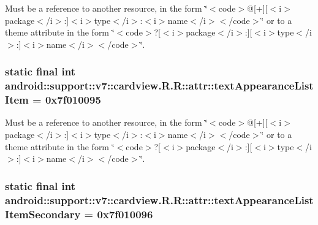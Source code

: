 Must be a reference to another resource, in the form \char`\"{}$<$code$>$@\mbox{[}+\mbox{]}\mbox{[}$<$i$>$package$<$/i$>$:\mbox{]}$<$i$>$type$<$/i$>$:$<$i$>$name$<$/i$>$$<$/code$>$\char`\"{} or to a theme attribute in the form \char`\"{}$<$code$>$?\mbox{[}$<$i$>$package$<$/i$>$:\mbox{]}\mbox{[}$<$i$>$type$<$/i$>$:\mbox{]}$<$i$>$name$<$/i$>$$<$/code$>$\char`\"{}. \hypertarget{classandroid_1_1support_1_1v7_1_1cardview_1_1_r_1_1attr_d722356d7f2c26113054f69f2712d3ed}{
\subsubsection[{textAppearanceListItem}]{\setlength{\rightskip}{0pt plus 5cm}static final int android::support::v7::cardview.R.R::attr::textAppearanceListItem = 0x7f010095}}
\label{classandroid_1_1support_1_1v7_1_1cardview_1_1_r_1_1attr_d722356d7f2c26113054f69f2712d3ed}


Must be a reference to another resource, in the form \char`\"{}$<$code$>$@\mbox{[}+\mbox{]}\mbox{[}$<$i$>$package$<$/i$>$:\mbox{]}$<$i$>$type$<$/i$>$:$<$i$>$name$<$/i$>$$<$/code$>$\char`\"{} or to a theme attribute in the form \char`\"{}$<$code$>$?\mbox{[}$<$i$>$package$<$/i$>$:\mbox{]}\mbox{[}$<$i$>$type$<$/i$>$:\mbox{]}$<$i$>$name$<$/i$>$$<$/code$>$\char`\"{}. \hypertarget{classandroid_1_1support_1_1v7_1_1cardview_1_1_r_1_1attr_f5f3563881936413a812ef4bc33a2692}{
\subsubsection[{textAppearanceListItemSecondary}]{\setlength{\rightskip}{0pt plus 5cm}static final int android::support::v7::cardview.R.R::attr::textAppearanceListItemSecondary = 0x7f010096}}
\label{classandroid_1_1support_1_1v7_1_1cardview_1_1_r_1_1attr_f5f3563881936413a812ef4bc33a2692}


